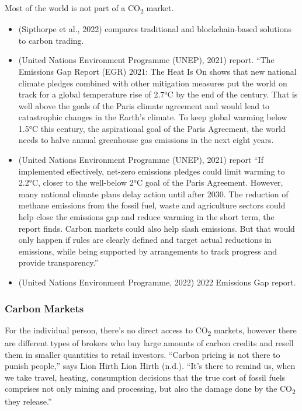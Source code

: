 \documentclass[
  letterpaper,
  DIV=11,
  numbers=noendperiod]{scrartcl}
\providecommand{\tightlist}{%
  \setlength{\itemsep}{0pt}\setlength{\parskip}{0pt}}\usepackage{longtable,booktabs,array}
\begin{document}
Most of the world is not part of a CO\textsubscript{2} market.

\begin{itemize}
\tightlist
\item
  (Sipthorpe et al., 2022) compares traditional and blockchain-based
  solutions to carbon trading.
\item
  (United Nations Environment Programme (UNEP), 2021) report. ``The
  Emissions Gap Report (EGR) 2021: The Heat Is On shows that new
  national climate pledges combined with other mitigation measures put
  the world on track for a global temperature rise of 2.7°C by the end
  of the century. That is well above the goals of the Paris climate
  agreement and would lead to catastrophic changes in the Earth's
  climate. To keep global warming below 1.5°C this century, the
  aspirational goal of the Paris Agreement, the world needs to halve
  annual greenhouse gas emissions in the next eight years.
\item
  (United Nations Environment Programme (UNEP), 2021) report ``If
  implemented effectively, net-zero emissions pledges could limit
  warming to 2.2°C, closer to the well-below 2°C goal of the Paris
  Agreement. However, many national climate plans delay action until
  after 2030. The reduction of methane emissions from the fossil fuel,
  waste and agriculture sectors could help close the emissions gap and
  reduce warming in the short term, the report finds. Carbon markets
  could also help slash emissions. But that would only happen if rules
  are clearly defined and target actual reductions in emissions, while
  being supported by arrangements to track progress and provide
  transparency.''
\item
  (United Nations Environment Programme, 2022) 2022 Emissions Gap
  report.
\end{itemize}

\subsubsection{Carbon Markets}\label{carbon-markets}

For the individual person, there's no direct access to
CO\textsubscript{2} markets, however there are different types of
brokers who buy large amounts of carbon credits and resell them in
smaller quantities to retail investors. ``Carbon pricing is not there to
punish people,'' says Lion Hirth Lion Hirth (n.d.). ``It's there to
remind us, when we take travel, heating, consumption decisions that the
true cost of fossil fuels comprises not only mining and processing, but
also the damage done by the CO\textsubscript{2} they release.''
\end{document}
